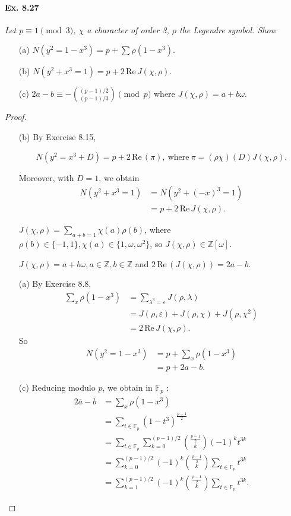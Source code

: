 \documentclass[11pt,a4paper]{article}
\newcommand{\F}{\mathbb{F}}
\newcommand{\re}{\,\mathrm{Re}\,}
\begin{document}
{\paragraph{Ex. 8.27}

{\it Let $p\equiv 1 \pmod 3$, $\chi$ a character of order 3, $\rho$ the Legendre symbol. Show
\begin{enumerate}
\item[(a)] $N(y^2 = 1 - x^3) = p + \sum \rho(1-x^3)$.
\item[(b)] $N(y^2 + x^3 = 1) = p + 2 \re J(\chi,\rho)$.
\item[(c)] $2a-b \equiv - \binom{(p-1)/2}{(p-1)/3} \pmod p$ where $J(\chi,\rho) = a + b \omega$.
\end{enumerate}
}

\begin{proof} 


\begin{enumerate} 

\item[(b)] By Exercise 8.15,

$$N(y^2=x^3+D) = p + 2 \re(\pi), \ \mathrm{where}\ \pi =(\rho \chi)(D) J(\chi,\rho).$$

Moreover, with $D = 1$, we obtain
\begin{align*}
N(y^2+x^3=1) &= N(y^2+(-x)^3=1) \\
 &= p+  2 \re J(\chi,\rho).
\end{align*}

$J(\chi,\rho) = \sum\limits_{a+b=1} \chi(a) \rho(b)$, where $\rho(b)\in \{-1,1\}, \chi(a) \in \{1,\omega,\omega^2\}$, so $J(\chi,\rho) \in \mathbb{Z}[\omega]$.

$J(\chi,\rho) = a + b\omega, a\in \mathbb{Z}, b \in \mathbb{Z}$ and $2 \re(J(\chi,\rho)) = 2a-b$.

\item[(a)] By Exercise 8.8,
\begin{align*}
\sum\limits_x\rho(1-x^3) &= \sum\limits_{\lambda^3=\varepsilon} J(\rho,\lambda)\\
&=J(\rho,\varepsilon) + J(\rho,\chi) + J(\rho,\chi^2)\\
&= 2 \re J(\chi,\rho).
\end{align*}
So
\begin{align*}
N(y^2=1-x^3) &= p + \sum_x \rho(1-x^3)\\
&= p+2a-b.
\end{align*}


\item[(c)]Reducing modulo $p$, we obtain  in $\F_p$ :
\begin{align*}
2\overline{a}  -\overline {b} &= \sum\limits_{x} \rho(1-x^3)\\
&=  \sum\limits_{t \in \F_p} (1-t^3)^{\frac{p-1}{2}}\\
&= \sum\limits_{t \in \F_p} \sum\limits_{k=0}^{(p-1)/2} \binom{\frac{p-1}{2}}{k} (-1)^k t^{3k}\\
&=  \sum\limits_{k=0}^{(p-1)/2}(-1)^k \binom{\frac{p-1}{2}}{k}\sum\limits_{t \in \F_p}   t^{3k}\\
&= \sum\limits_{k=1}^{(p-1)/2}(-1)^k \binom{\frac{p-1}{2}}{k}\sum\limits_{t \in \F_p}   t^{3k}. 
\end{align*}


\end{enumerate}
\end{proof}}
\end{document}
